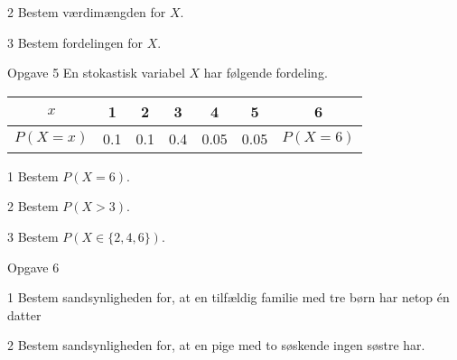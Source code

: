 \begin{delopgave}{}{2}
	Bestem værdimængden for $X$.
\end{delopgave}
\begin{delopgave}{}{3}
	Bestem fordelingen for $X$.
\end{delopgave}

\begin{opgavetekst}{Opgave 5}
	En stokastisk variabel $X$ har følgende fordeling.
	\begin{center}
		\vspace{0.5cm}
		\begin{tabular}{c|c|c|c|c|c|c}
			$x$ & 1 & 2 & 3 & 4 & 5 & 6 \\
			\hline
			$P(X = x)$ & 0.1 & 0.1 & 0.4 & 0.05 & 0.05 & $P(X = 6)$
		\end{tabular}
	\end{center}
	\phantom{h}
\end{opgavetekst}

\begin{delopgave}{}{1}
	Bestem $P(X = 6)$.
\end{delopgave}
\begin{delopgave}{}{2}
	Bestem $P(X > 3)$.
\end{delopgave}
\begin{delopgave}{}{3}
	Bestem $P(X \in \{2,4,6\})$.
\end{delopgave}

\begin{opgavetekst}{Opgave 6}
\end{opgavetekst}
\begin{delopgave}{}{1}
	Bestem sandsynligheden for, at en tilfældig familie med tre børn har netop én datter
\end{delopgave}
\begin{delopgave}{}{2}
	Bestem sandsynligheden for, at en pige med to søskende ingen søstre har. 
\end{delopgave}
